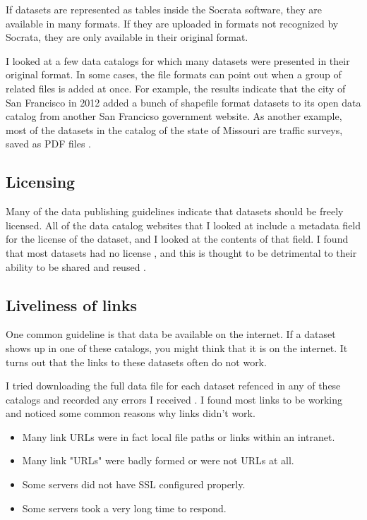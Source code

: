 \documentclass{acm_proc_article-sp}
\begin{document}
If datasets are represented as tables inside the Socrata
software, they are available in many formats. If they are uploaded in formats
not recognized by Socrata, they are only available in their original format.

I looked at a few data catalogs for which many datasets were presented in
their original format. In some cases, the file formats can point out when a
group of related files is added at once. For example, the results indicate
that the city of San Francisco in 2012 added a bunch of shapefile format
datasets to its open data catalog from another San Francicso government
website. As another example, most of the datasets in the catalog of the
state of Missouri are traffic surveys, saved as PDF files \cite{missouri}.

\subsection{Licensing}
Many of the data publishing guidelines indicate that datasets should be freely
licensed. All of the data catalog websites that I looked at include a metadata
field for the license of the dataset, and I looked at the contents of that field.
I found that most datasets had no license \cite{licensing}, and this is thought
to be detrimental to their ability to be shared and reused
\cite{open-data-census,fivestars,sunlight,sebastopol,odi}.

\subsection{Liveliness of links}
One common guideline is that data be available on the internet. If a dataset
shows up in one of these catalogs, you might think that it is on the internet.
It turns out that the links to these datasets often do not work.

I tried downloading the
full data file for each dataset refenced in any of these catalogs and recorded
any errors I received \cite{dead,zombie}. I found most links to be working and
noticed some common reasons why links didn't work.
\begin{itemize}
\setlength{\itemsep}{0pt}
\item Many link URLs were in fact local file paths or links within an intranet.
\item Many link "URLs" were badly formed or were not URLs at all.
\item Some servers did not have SSL configured properly.
\item Some servers took a very long time to respond.
\end{itemize}
\end{document}
